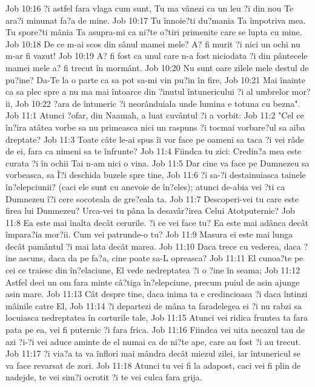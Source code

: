 Job 10:16  ?i astfel fara vlaga cum sunt, Tu ma vânezi ca un leu ?i din nou Te ara?i minunat fa?a de mine.
Job 10:17  Tu înnoie?ti du?mania Ta împotriva mea. Tu spore?ti mânia Ta asupra-mi ca ni?te o?tiri primenite care se lupta cu mine.
Job 10:18  De ce m-ai scos din sânul mamei mele? A? fi murit ?i nici un ochi nu m-ar fi vazut!
Job 10:19  A? fi fost ca unul care n-a fost niciodata ?i din pântecele mamei mele a? fi trecut în mormânt.
Job 10:20  Nu sunt oare zilele mele destul de pu?ine? Da-Te la o parte ca sa pot sa-mi vin pu?in în fire,
Job 10:21  Mai înainte ca sa plec spre a nu ma mai întoarce din ?inutul întunericului ?i al umbrelor mor?ii,
Job 10:22  ?ara de întuneric ?i neorânduiala unde lumina e totuna cu bezna".
Job 11:1  Atunci ?ofar, din Naamah, a luat cuvântul ?i a vorbit:
Job 11:2  "Cel ce în?ira atâtea vorbe sa nu primeasca nici un raspuns ?i tocmai vorbare?ul sa aiba dreptate?
Job 11:3  Toate câte le-ai spus îi vor face pe oameni sa taca ?i vei râde de ei, fara ca nimeni sa te înfrunte?
Job 11:4  Fiindca tu zici: Credin?a mea este curata ?i în ochii Tai n-am nici o vina.
Job 11:5  Dar cine va face pe Dumnezeu sa vorbeasca, sa Î?i deschida buzele spre tine,
Job 11:6  ?i sa-?i destainuiasca tainele în?elepciunii? (caci ele sunt cu anevoie de în?eles); atunci de-abia vei ?ti ca Dumnezeu î?i cere socoteala de gre?eala ta.
Job 11:7  Descoperi-vei tu care este firea lui Dumnezeu? Urca-vei tu pâna la desavâr?irea Celui Atotputernic?
Job 11:8  Ea este mai înalta decât cerurile. ?i ce vei face tu? Ea este mai adânca decât împara?ia mor?ii. Cum vei patrunde-o tu?
Job 11:9  Masura ei este mai lunga decât pamântul ?i mai lata decât marea.
Job 11:10  Daca trece cu vederea, daca ?ine ascuns, daca da pe fa?a, cine poate sa-L opreasca?
Job 11:11  El cunoa?te pe cei ce traiesc din în?elaciune, El vede nedreptatea ?i o ?ine în seama;
Job 11:12  Astfel deci un om fara minte câ?tiga în?elepciune, precum puiul de asin ajunge asin mare.
Job 11:13  Cât despre tine, daca inima ta e credincioasa ?i daca întinzi mâinile catre El,
Job 11:14  ?i departezi de mâna ta faradelegea ei ?i nu rabzi sa locuiasca nedreptatea în corturile tale,
Job 11:15  Atunci vei ridica fruntea ta fara pata pe ea, vei fi puternic ?i fara frica.
Job 11:16  Fiindca vei uita necazul tau de azi ?i-?i vei aduce aminte de el numai ca de ni?te ape, care au fost ?i au trecut.
Job 11:17  ?i via?a ta va înflori mai mândra decât miezul zilei, iar întunericul se va face revarsat de zori.
Job 11:18  Atunci tu vei fi la adapost, caci vei fi plin de nadejde, te vei sim?i ocrotit ?i te vei culca fara grija.

